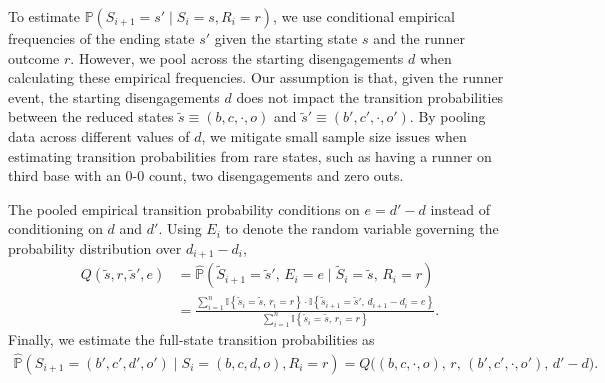 \documentclass[11pt]{article}
\begin{document}
      To estimate $\mathbb{P}(S_{i+1} = s' \mid S_i   = s, R_i = r)$, we use conditional empirical frequencies of the ending state $s'$ given the starting state $s$ and the runner outcome $r$. However, we pool across the starting disengagements $d$ when calculating these empirical frequencies. Our assumption is that, given the runner event, the starting disengagements $d$ does not impact the transition probabilities between the reduced states $\tilde s \equiv (b, c, \cdot, o)$ and $\tilde s' \equiv (b', c', \cdot, o')$. By pooling data across different values of $d$, we mitigate small sample size issues when estimating transition probabilities from rare states, such as having a runner on third base with an 0-0 count, two disengagements and zero outs.

      The pooled empirical transition probability conditions on $e = d' - d$ instead of conditioning on $d$ and $d'$. Using $E_{i}$ to denote the random variable governing the probability distribution over $d_{i + 1} - d_i$,
      \begin{align*}                                  
        Q(\tilde s, r, \tilde s', e)                  
          &= \hat{\mathbb{P}}\left(\tilde S_{i+1} =   \tilde s',\, E_i = e \mid \tilde S_i = \tilde s,\, R_i = r\right)\\
          &= \frac
            {\sum_{i=1}^n\mathbb{I}\left\{\tilde s_i = \tilde s,\, r_i = r\right\} \cdot \mathbb{I}\left\{\tilde s_{i+1} = \tilde s',\, d_{i+1} - d_i = e\right\}}
            {\sum_{i=1}^n\mathbb{I}\left\{\tilde s_i = \tilde s,\, r_i = r\right\}}.
      \end{align*}
      Finally, we estimate the full-state transition probabilities as
      \begin{align*}
        \hat{\mathbb{P}}(S_{i+1} = (b', c', d', o') \mid S_i = (b, c, d, o), R_i = r) = Q\big((b, c, \cdot, o),\, r,\, (b', c', \cdot, o'),\, d' - d\big).
      \end{align*}
\end{document}
